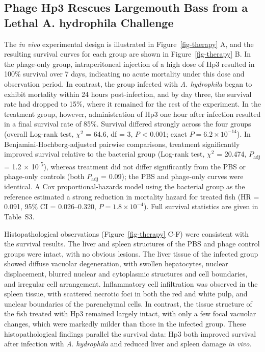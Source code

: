 \documentclass[11pt,a4paper]{article}
\begin{document}
\subsection{Phage Hp3 Rescues Largemouth Bass from a Lethal A.
hydrophila
Challenge}\label{phage-hp3-rescues-largemouth-bass-from-a-lethal-a.-hydrophila-challenge}

The \emph{in vivo} experimental design is illustrated in
Figure~\ref{fig-therapy} A, and the resulting survival curves for each
group are shown in Figure~\ref{fig-therapy} B. In the phage-only group,
intraperitoneal injection of a high dose of Hp3 resulted in 100\%
survival over 7 days, indicating no acute mortality under this dose
and observation period. In contrast, the group infected with
\emph{A. hydrophila} began to exhibit mortality within 24 hours
post-infection, and by day three, the survival rate had dropped to
15\%, where it remained for the rest of the experiment. In the treatment
group, however, administration of Hp3 one hour after infection resulted
in a final survival rate of 85\%. Survival differed strongly across the
four groups (overall Log-rank test, \(\chi^2\) = 64.6, df = 3,
\(P\) \textless{} 0.001; exact \(P = 6.2 \times 10^{-14}\)). In
Benjamini-Hochberg-adjusted pairwise comparisons, treatment significantly
improved survival relative to the bacterial group (Log-rank test,
\(\chi^2\) = 20.474, \(P_{\mathrm{adj}}\) = 1.2 ×
10\textsuperscript{-5}), whereas treatment did not differ significantly
from the PBS or phage-only controls (both \(P_{\mathrm{adj}}\) = 0.09);
the PBS and phage-only curves were identical. A Cox proportional-hazards
model using the bacterial group as the reference estimated a strong
reduction in mortality hazard for treated fish (HR = 0.091, 95\% CI =
0.026--0.320, \(P = 1.8 \times 10^{-4}\)). Full survival statistics are
given in Table~S3.

Histopathological observations (Figure~\ref{fig-therapy} C-F) were
consistent with the survival results. The liver and spleen structures of
the PBS and phage control groups were intact, with no obvious lesions.
The liver tissue of the infected group showed diffuse vacuolar
degeneration, with swollen hepatocytes, nuclear displacement, blurred
nuclear and cytoplasmic structures and cell boundaries, and irregular
cell arrangement. Inflammatory cell infiltration was observed in the
spleen tissue, with scattered necrotic foci in both the red and white
pulp, and unclear boundaries of the parenchymal cells. In contrast, the
tissue structure of the fish treated with Hp3 remained largely intact,
with only a few focal vacuolar changes, which were markedly milder
than those in the infected group. These histopathological findings
parallel the survival data: Hp3 both improved survival after infection
with \emph{A}. \emph{hydrophila} and reduced liver and spleen damage
\emph{in vivo}.
\end{document}
